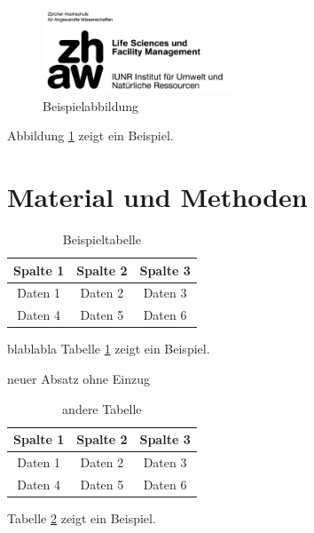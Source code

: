 \documentclass[a4paper,11pt,twoside]{article}
\begin{document}
	\begin{figure}[b] %
		\raggedright %
		\includegraphics[width=0.5\textwidth]{zhaw_lsfm_iunr_schwarz.jpg} %
		\caption{Beispielabbildung}
		\label{fig:beispiel}
	\end{figure}
	Abbildung \ref{fig:beispiel} zeigt ein Beispiel.
	
	
	\newpage
	\section{Material und Methoden}
	\begin{table}[ht]
		\raggedright
		\caption{Beispieltabelle}
		\begin{tabular}{|c|c|c|}
			\hline
			Spalte 1 & Spalte 2 & Spalte 3 \\ \hline
			Daten 1  & Daten 2  & Daten 3  \\ \hline
			Daten 4  & Daten 5  & Daten 6  \\ \hline
		\end{tabular}
		\label{tab:beispiel}
	\end{table} 
	\noindent %
	blablabla Tabelle \ref{tab:beispiel} zeigt ein Beispiel.
	\\%
	\par\noindent neuer Absatz ohne Einzug
	\begin{table}[ht]
		\centering
		\begin{tabular}{|c|c|c|}
			\hline
			Spalte 1 & Spalte 2 & Spalte 3 \\ \hline
			Daten 1  & Daten 2  & Daten 3  \\ \hline
			Daten 4  & Daten 5  & Daten 6  \\ \hline
		\end{tabular}
		\caption{andere Tabelle}
		\label{tab:andere}
	\end{table}
	\par\noindent  Tabelle \ref{tab:andere} zeigt ein Beispiel.
	
\end{document}
